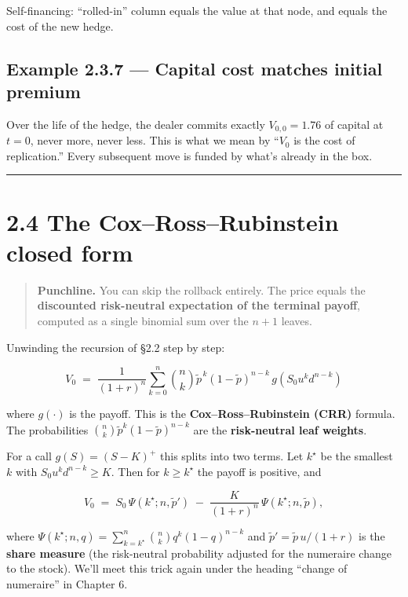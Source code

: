 \documentclass[
  10pt,
  twoside]{book}
\begin{document}
Self-financing: ``rolled-in'' column equals the value at that node, and
equals the cost of the new hedge.

\subsection{Example 2.3.7 --- Capital cost matches initial
premium}\label{example-2.3.7-capital-cost-matches-initial-premium}

Over the life of the hedge, the dealer commits exactly \(V_{0,0}=1.76\)
of capital at \(t=0\), never more, never less. This is what we mean by
``\(V_0\) is the cost of replication.'' Every subsequent move is funded
by what's already in the box.

\begin{center}\rule{0.5\linewidth}{0.5pt}\end{center}

\section{2.4 The Cox--Ross--Rubinstein closed
form}\label{the-coxrossrubinstein-closed-form}

\begin{quote}
\textbf{Punchline.} You can skip the rollback entirely. The price equals
the \textbf{discounted risk-neutral expectation of the terminal payoff},
computed as a single binomial sum over the \(n+1\) leaves.
\end{quote}

Unwinding the recursion of §2.2 step by step:

\[
\boxed{\;V_0 \;=\; \frac{1}{(1+r)^n}\sum_{k=0}^{n}\binom{n}{k}\tilde p^{\,k}(1-\tilde p)^{n-k}\,g\!\left(S_0 u^k d^{n-k}\right)\;}
\]

where \(g(\cdot)\) is the payoff. This is the
\textbf{Cox--Ross--Rubinstein (CRR)} formula. The probabilities
\(\binom{n}{k}\tilde p^k(1-\tilde p)^{n-k}\) are the
\textbf{risk-neutral leaf weights}.

For a call \(g(S)=(S-K)^+\) this splits into two terms. Let \(k^\star\)
be the smallest \(k\) with \(S_0 u^k d^{n-k}\ge K\). Then for
\(k\ge k^\star\) the payoff is positive, and

\[
V_0 \;=\; S_0\,\Psi(k^\star; n, \tilde p') \;-\; \frac{K}{(1+r)^n}\,\Psi(k^\star; n, \tilde p),
\]

where
\(\Psi(k^\star;n,q) = \sum_{k=k^\star}^{n}\binom{n}{k}q^k(1-q)^{n-k}\)
and \(\tilde p' = \tilde p\,u/(1+r)\) is the \textbf{share measure} (the
risk-neutral probability adjusted for the numeraire change to the
stock). We'll meet this trick again under the heading ``change of
numeraire'' in Chapter 6.
\end{document}
